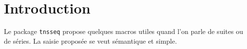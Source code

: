 \documentclass[12pt,a4paper]{article}
\begin{document}
\section{Introduction}

Le package \verb+tnsseq+ propose quelques macros utiles quand l'on parle de suites ou de séries. La saisie proposée se veut sémantique et simple.
\end{document}
